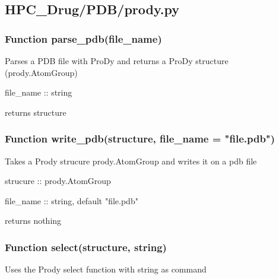 

\subsection{HPC\_Drug/PDB/prody.py}

    \subsubsection{Function parse\_pdb(file\_name)}

        Parses a PDB file with ProDy and returns a ProDy structure (prody.AtomGroup)

        file\_name :: string

        returns structure


    \subsubsection{Function write\_pdb(structure, file\_name = "file.pdb")}

        Takes a Prody strucure prody.AtomGroup and writes it on a pdb file

        strucure :: prody.AtomGroup
        
        file\_name :: string, default "file.pdb"

        returns nothing


    \subsubsection{Function select(structure, string)}
        
        Uses the Prody select function with string as command

